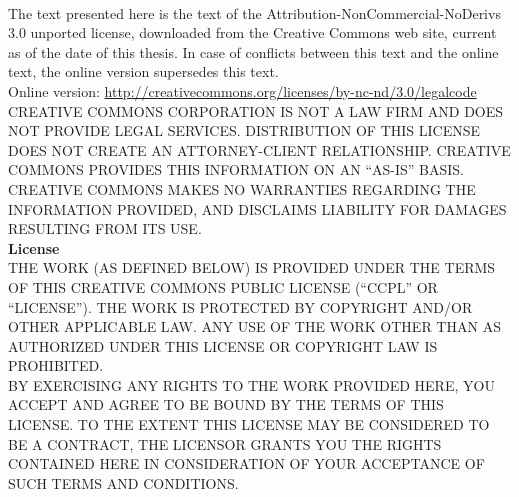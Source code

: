 \clearpage
\thispagestyle{empty}
\setcounter{secnumdepth}{0}
\label{appendix:license}
\\

The text presented here is the text of the Attribution-NonCommercial-NoDerivs
3.0 unported license, downloaded from the Creative Commons web site, current as
of the date of this thesis. In case of conflicts between this text and the
online text, the online version supersedes this text. \\

Online version: \url{http://creativecommons.org/licenses/by-nc-nd/3.0/legalcode} 
\\

CREATIVE COMMONS CORPORATION IS NOT A LAW FIRM AND DOES NOT PROVIDE LEGAL
SERVICES. DISTRIBUTION OF THIS LICENSE DOES NOT CREATE AN ATTORNEY-CLIENT
RELATIONSHIP. CREATIVE COMMONS PROVIDES THIS INFORMATION ON AN ``AS-IS'' BASIS.
CREATIVE COMMONS MAKES NO WARRANTIES REGARDING THE INFORMATION PROVIDED, AND
DISCLAIMS LIABILITY FOR DAMAGES RESULTING FROM ITS USE. \\

\textbf{License} \\

THE WORK (AS DEFINED BELOW) IS PROVIDED UNDER THE TERMS OF THIS CREATIVE COMMONS
PUBLIC LICENSE (``CCPL'' OR ``LICENSE''). THE WORK IS PROTECTED BY COPYRIGHT AND/OR
OTHER APPLICABLE LAW. ANY USE OF THE WORK OTHER THAN AS AUTHORIZED UNDER THIS
LICENSE OR COPYRIGHT LAW IS PROHIBITED.\\

BY EXERCISING ANY RIGHTS TO THE WORK PROVIDED HERE, YOU ACCEPT AND AGREE TO BE
BOUND BY THE TERMS OF THIS LICENSE. TO THE EXTENT THIS LICENSE MAY BE CONSIDERED
TO BE A CONTRACT, THE LICENSOR GRANTS YOU THE RIGHTS CONTAINED HERE IN
CONSIDERATION OF YOUR ACCEPTANCE OF SUCH TERMS AND CONDITIONS.\\

